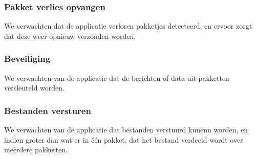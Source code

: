 \documentclass{article}
\begin{document}
\subsubsection{Pakket verlies opvangen}
We verwachten dat de applicatie verloren pakketjes detecteerd, en ervoor zorgt dat deze weer opnieuw verzonden worden. \\

\subsubsection{Beveiliging}
We verwachten van de applicatie dat de berichten of data uit pakketten versleuteld worden. \\

\subsubsection{Bestanden versturen}
We verwachten van de applicatie dat bestanden verstuurd kunenn worden, en indien groter dan wat er in \'{e}\'{e}n pakket, dat het bestand verdeeld wordt over meerdere pakketten. \\
\end{document}
